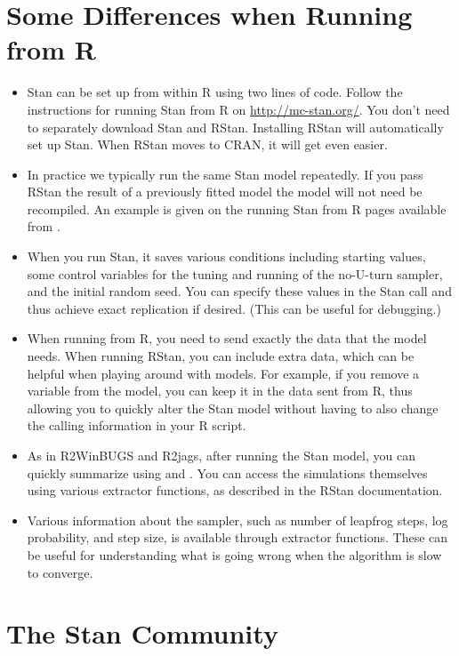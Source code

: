 \section{Some Differences when Running from R}

\begin{itemize}

\item Stan can be set up from within R using two lines of code.
  Follow the instructions for running Stan from R on
  \url{http://mc-stan.org/}.  You don't need to separately download
  Stan and RStan.  Installing RStan will automatically set up Stan.
  When RStan moves to CRAN, it will get even easier.
\item In practice we typically run the same Stan model repeatedly.  If
  you pass RStan the result of a previously fitted model the model will 
  not need be recompiled. An example is given on the running
  Stan from R pages available from .
\item When you run Stan, it saves various conditions including
  starting values, some control variables for the tuning and running
  of the no-U-turn sampler, and the initial random seed. You can
  specify these values in the Stan call and thus achieve exact
  replication if desired.  (This can be useful for debugging.)
\item When running \BUGS from R, you need to send exactly the data
  that the model needs.  When running RStan, you can include extra
  data, which can be helpful when playing around with models.  For
  example, if you remove a variable  from the model, you can keep
  it in the data sent from R, thus allowing you to quickly alter the
  Stan model without having to also change the calling information in
  your R script.
\item As in R2WinBUGS and R2jags, after running the Stan model, you
  can quickly summarize using  and .  You
  can access the simulations themselves using various extractor
  functions, as described in the RStan documentation.  
\item Various information about the sampler, such as number of
  leapfrog steps, log probability, and step size, is available through
  extractor functions.   These can be useful for understanding what is
  going wrong when the algorithm is slow to converge.
\end{itemize}

\section{The Stan Community}

